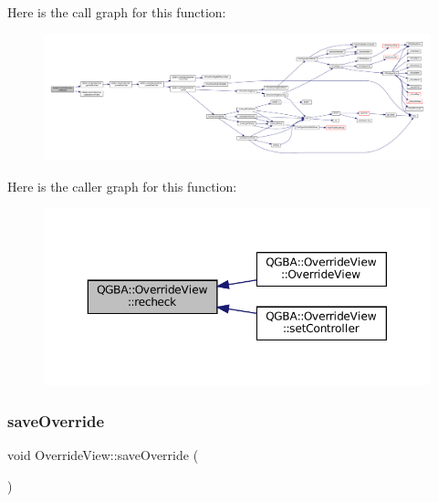 Here is the call graph for this function\+:
\nopagebreak
\begin{figure}[H]
\begin{center}
\leavevmode
\includegraphics[width=350pt]{class_q_g_b_a_1_1_override_view_ae0189dfd85dda5d45756da0344c09634_cgraph}
\end{center}
\end{figure}
Here is the caller graph for this function\+:
\nopagebreak
\begin{figure}[H]
\begin{center}
\leavevmode
\includegraphics[width=350pt]{class_q_g_b_a_1_1_override_view_ae0189dfd85dda5d45756da0344c09634_icgraph}
\end{center}
\end{figure}
\mbox{\label{class_q_g_b_a_1_1_override_view_a5f4267251191520565245e35ffeb54dd}} 
\subsubsection{\texorpdfstring{save\+Override}{saveOverride}}
{\footnotesize\ttfamily void Override\+View\+::save\+Override (\begin{DoxyParamCaption}{ }\end{DoxyParamCaption})\hspace{0.3cm}{\ttfamily [slot]}}

